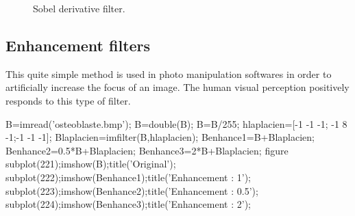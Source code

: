 \begin{figure}[htbp]
 \caption{Sobel derivative filter.}
 \label{fig:introduction:matlab:sobel}
\end{figure}

\subsection{Enhancement filters}
This quite simple method is used in photo manipulation softwares in order to artificially increase the focus of an image. The human visual perception  positively responds to this type of filter.
\begin{matlab}
B=imread('osteoblaste.bmp');
B=double(B);
B=B/255;
hlaplacien=[-1 -1 -1; -1 8 -1;-1 -1 -1];
Blaplacien=imfilter(B,hlaplacien);
Benhance1=B+Blaplacien;
Benhance2=0.5*B+Blaplacien;
Benhance3=2*B+Blaplacien;
figure
subplot(221);imshow(B);title('Original');
subplot(222);imshow(Benhance1);title('Enhancement : 1');
subplot(223);imshow(Benhance2);title('Enhancement : 0.5');
subplot(224);imshow(Benhance3);title('Enhancement : 2');
\end{matlab}


